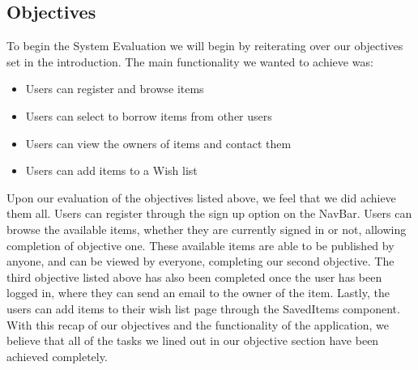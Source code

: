 \subsection{Objectives}
To begin the System Evaluation we will begin by reiterating over our objectives set in the introduction. The main functionality we wanted to achieve was:
\begin{itemize}
    \item Users can register and browse items
    \item Users can select to borrow items from other users
    \item Users can view the owners of items and contact them
    \item Users can add items to a Wish list
\end{itemize}
\par Upon our evaluation of the objectives listed above, we feel that we did achieve them all. Users can register through the sign up option on the NavBar. Users can browse the available items, whether they are currently signed in or not, allowing completion of objective one. These available items are able to be published by anyone, and can be viewed by everyone, completing our second objective. The third objective listed above has also been completed once the user has been logged in, where they can send an email to the owner of the item. Lastly, the users can add items to their wish list page through the SavedItems component. With this recap of our objectives and the functionality of the application, we believe that all of the tasks we lined out in our objective section have been achieved completely. \par
